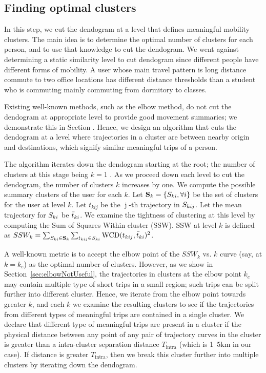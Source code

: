 \subsection{Finding optimal clusters}
In this step, we cut the dendogram at a level that defines meaningful mobility clusters. The main idea is to determine the optimal number of clusters for each person, and to use that knowledge to cut the dendogram. We went against determining a static similarity level to cut dendogram since different people have different forms of mobility. A user whose main travel pattern is long distance commute to two office locations has different distance thresholds than a student who is commuting mainly commuting from dormitory to classes. 

Existing well-known methods, such as the elbow method, do not cut the dendogram at appropriate level to provide good movement summaries; we demonstrate this in Section \label{sec:elbow}. Hence, we design an algorithm that cuts the dendogram at a level where trajectories in a cluster are between nearby origin and destinations, which signify similar meaningful trips of a person.

The algorithm iterates down the dendogram starting at the root; the number of clusters at this stage being $k=1$ . As we proceed down each level to cut the dendogram, the number of clusters $k$ increases by one. We compute the possible summary clusters of the user for each $k$. Let $\mathbf{S}_k =  \{ S_{ki}, \forall i \}$ be the set of clusters for the user at level $k$. Let $t_{kij}$ be the $\operatorname{j}$-th trajectory in $S_{kij}$. Let the mean trajectory for $S_{ki}$ be $\bar{t}_{ki}$. We examine the tightness of clustering at this level by computing the Sum of Squares Within cluster (SSW). SSW at level $k$ is defined as $SSW_k=\sum_{S_{ki} \in \mathbf{S}_k} \sum_{t_{kij} \in S_{ki}} \operatorname{WCD}(t_{kij},\bar{t}_{ki})^2$.

A well-known metric is to accept the elbow point of the $SSW_k$ vs. $k$ curve (say, at $k=k_e$) as the optimal number of clusters. However, as we show in Section~\ref{sec:elbowNotUseful}, the trajectories in clusters at the elbow point $k_e$ may contain multiple type of short trips in a small region; such trips can be split further into different cluster. Hence, we iterate from the elbow point towards greater $k$, and each $k$ we examine the resulting clusters to see if the trajectories from different types of meaningful trips are contained in a single cluster. We declare that different type of meaningful trips are present in a cluster if the physical distance between any point of any pair of trajectory curves in the cluster is greater than a intra-cluster separation distance $T_{\operatorname{intra}}$ (which is \unit{1.5}{km} in our case). If distance is greater $T_{\operatorname{intra}}$, then we break this cluster further into multiple clusters by iterating down the dendogram. 

